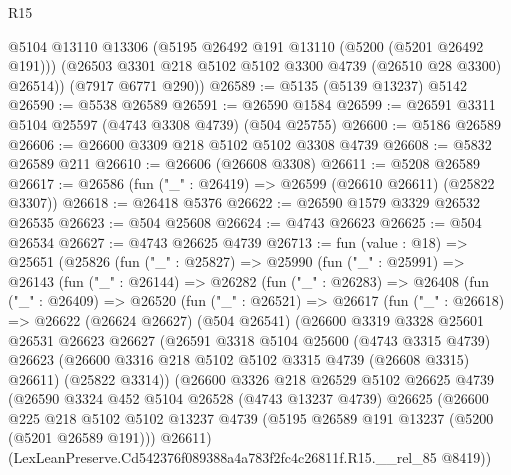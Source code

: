 \begin{lexlean}{R15}
\begin{coremodule}
{{{{{{{{{{{        @5104
        @13110
        @13306
        (@5195 @26492 @191 @13110 (@5200 (@5201 @26492 @191)))
        (@26503 @3301 @218 @5102 @5102 @3300 @4739 (@26510 @28 @3300) @26514))
      (@7917 @6771 @290))
@26589 := @5135 (@5139 @13237) @5142
@26590 := @5538 @26589
@26591 := @26590 @1584
@26599 := @26591 @3311 @5104 @25597 (@4743 @3308 @4739) (@504 @25755)
@26600 := @5186 @26589
@26606 := @26600 @3309 @218 @5102 @5102 @3308 @4739
@26608 := @5832 @26589 @211
@26610 := @26606 (@26608 @3308)
@26611 := @5208 @26589
@26617 := @26586 (fun ("_" : @26419) => @26599 (@26610 @26611) (@25822 @3307))
@26618 := @26418 @5376
@26622 := @26590 @1579 @3329 @26532 @26535
@26623 := @504 @25608
@26624 := @4743 @26623
@26625 := @504 @26534
@26627 := @4743 @26625 @4739
@26713 := fun (value : @18) =>
  @25651
    (@25826
      (fun ("_" : @25827) =>
      @25990
        (fun ("_" : @25991) =>
        @26143
          (fun ("_" : @26144) =>
          @26282
            (fun ("_" : @26283) =>
            @26408
              (fun ("_" : @26409) =>
              @26520
                (fun ("_" : @26521) =>
                @26617
                  (fun ("_" : @26618) =>
                  @26622
                    (@26624 @26627)
                    (@504 @26541)
                    (@26600
                      @3319
                      @3328
                      @25601
                      @26531
                      @26623
                      @26627
                      (@26591
                        @3318
                        @5104
                        @25600
                        (@4743 @3315 @4739)
                        @26623
                        (@26600 @3316 @218 @5102 @5102 @3315 @4739 (@26608 @3315) @26611)
                        (@25822 @3314))
                      (@26600
                        @3326
                        @218
                        @26529
                        @5102
                        @26625
                        @4739
                        (@26590
                          @3324
                          @452
                          @5104
                          @26528
                          (@4743 @13237 @4739)
                          @26625
                          (@26600
                            @225
                            @218
                            @5102
                            @5102
                            @13237
                            @4739
                            (@5195 @26589 @191 @13237 (@5200 (@5201 @26589 @191)))
                            @26611)
                          (LexLeanPreserve.Cd542376f089388a4a783f2fc4c26811f.R15.__rel_85 @8419))
}}}}}}}}}}}
\end{coremodule}
\end{lexlean}
